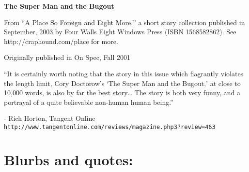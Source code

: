

\newenvironment{authorof}{\begin{flushright}\sffamily}{\end{flushright}}


\begin{center}
\textbf{\huge\textsf{
The Super Man and the Bugout
}}
\end{center}


\noindent

From ``A Place So Foreign and Eight More,'' a short story
collection published in September, 2003 by Four Walls Eight Windows
Press (ISBN 1568582862). See http://craphound.com/place for more.

Originally published in On Spec, Fall 2001

``It is certainly worth noting that the story in this issue which flagrantly 
violates the length limit, Cory Doctorow's `The Super Man and the Bugout,' at 
close to 10,000 words, is also by far the best story\ldots{} The story is both 
very funny, and a portrayal of a quite believable non-human human being.''

\begin{authorof}
- Rich Horton,
  Tangent Online\\
  \texttt{http://www.tangentonline.com/reviews/magazine.php3?review=463}
\end{authorof}

\section{Blurbs and quotes:}

